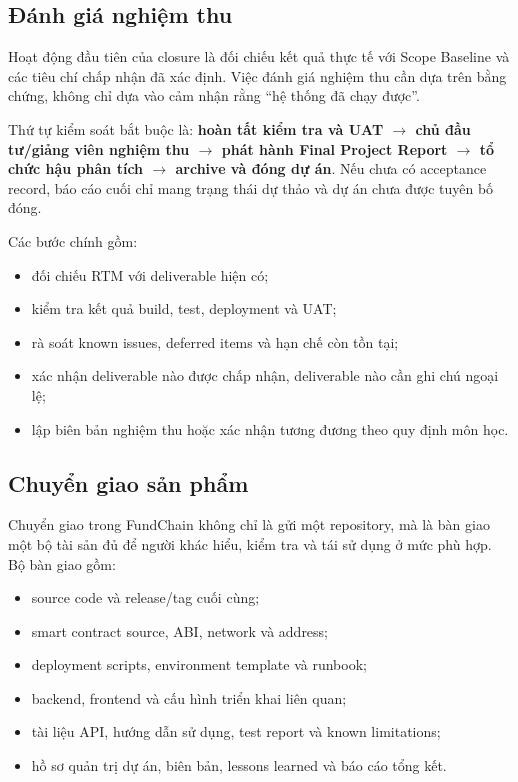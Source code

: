 \subsection{Đánh giá nghiệm thu}

Hoạt động đầu tiên của closure là đối chiếu kết quả thực tế với Scope Baseline và các tiêu chí chấp nhận đã xác định. Việc đánh giá nghiệm thu cần dựa trên bằng chứng, không chỉ dựa vào cảm nhận rằng ``hệ thống đã chạy được''.

Thứ tự kiểm soát bắt buộc là: \textbf{hoàn tất kiểm tra và UAT $\rightarrow$ chủ đầu tư/giảng viên nghiệm thu $\rightarrow$ phát hành Final Project Report $\rightarrow$ tổ chức hậu phân tích $\rightarrow$ archive và đóng dự án}. Nếu chưa có acceptance record, báo cáo cuối chỉ mang trạng thái dự thảo và dự án chưa được tuyên bố đóng.

Các bước chính gồm:

\begin{itemize}
  \item đối chiếu RTM với deliverable hiện có;
  \item kiểm tra kết quả build, test, deployment và UAT;
  \item rà soát known issues, deferred items và hạn chế còn tồn tại;
  \item xác nhận deliverable nào được chấp nhận, deliverable nào cần ghi chú ngoại lệ;
  \item lập biên bản nghiệm thu hoặc xác nhận tương đương theo quy định môn học.
\end{itemize}

\subsection{Chuyển giao sản phẩm}

Chuyển giao trong FundChain không chỉ là gửi một repository, mà là bàn giao một bộ tài sản đủ để người khác hiểu, kiểm tra và tái sử dụng ở mức phù hợp. Bộ bàn giao gồm:

\begin{itemize}
  \item source code và release/tag cuối cùng;
  \item smart contract source, ABI, network và address;
  \item deployment scripts, environment template và runbook;
  \item backend, frontend và cấu hình triển khai liên quan;
  \item tài liệu API, hướng dẫn sử dụng, test report và known limitations;
  \item hồ sơ quản trị dự án, biên bản, lessons learned và báo cáo tổng kết.
\end{itemize}

